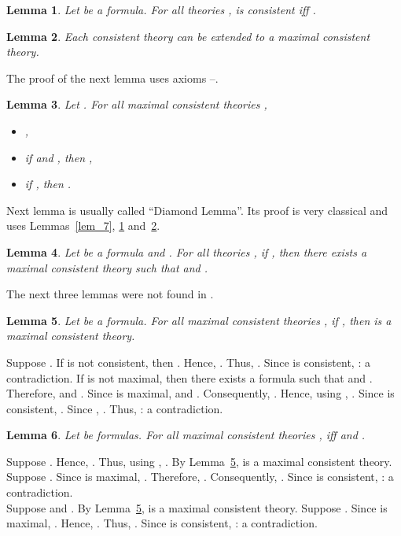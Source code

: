 \documentclass{article}[12pt]
\newtheorem{lemma}{Lemma}
\newenvironment{proof}{\noindent {\bf Proof \ }}{\hfill ~}
\begin{document}
\begin{lemma}\label{lem_7bis}
Let  be a formula.
For all theories ,  is consistent iff .
\end{lemma}
\begin{lemma}\label{lem_9}
Each consistent theory can be extended to a maximal consistent theory.
\end{lemma}
The proof of the next lemma uses axioms --.
\begin{lemma}\label{equivalence}
Let .
For all maximal consistent theories ,
\begin{itemize}
\item ,
\item if  and , then ,
\item if , then .
\end{itemize}
\end{lemma}
Next lemma is usually called ``Diamond Lemma''.
Its proof is very classical and uses Lemmas~\ref{lem_7}, \ref{lem_7bis} and~\ref{lem_9}.
\begin{lemma}\label{diamond_lemma}
Let  be a formula and .
For all theories , if , then there exists a maximal consistent theory  such that  and .
\end{lemma}
The next three lemmas were not found in \cite{balbianietal:2008}.
\begin{lemma}\label{lem_mcs}
Let  be a formula.
For all maximal consistent theories , if , then  is a maximal consistent theory.
\end{lemma}
\begin{proof}
Suppose .
If  is not consistent, then .
Hence, .
Thus, .
Since  is consistent, : a contradiction.
If  is not maximal, then there exists a formula  such that  and .
Therefore,  and .
Since  is maximal,  and .
Consequently, .
Hence, using , .
Since  is consistent, .
Since , .
Thus, : a contradiction.
\end{proof}
\begin{lemma}\label{lem_in_diamond}
Let  be formulas.
For all maximal consistent theories ,  iff  and .
\end{lemma}
\begin{proof}
 Suppose .
Hence, .
Thus, using , .
By Lemma~\ref{lem_mcs},  is a maximal consistent theory.
Suppose .
Since  is maximal, .
Therefore, .
Consequently, .
Since  is consistent, : a contradiction.
\\
 Suppose  and .
By Lemma~\ref{lem_mcs},  is a maximal consistent theory.
Suppose .
Since  is maximal, .
Hence, .
Thus, .
Since  is consistent, : a contradiction.
\end{proof}
\end{document}
